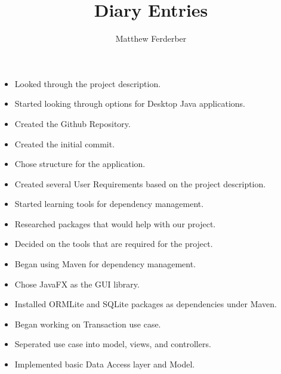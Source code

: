 \documentclass{article}
\title{Diary Entries}
\author{Matthew Ferderber}
\begin{document}
	\maketitle
	
  \begin{itemize}
    \item Looked through the project description.
		\item Started looking through options for Desktop Java applications.
  \end{itemize}
  
	
  \begin{itemize}
    \item Created the Github Repository.
    \item Created the initial commit.
    \item Chose structure for the application.
  \end{itemize}
  
  \begin{itemize}
    \item Created several User Requirements based on the project description.
    \item Started learning tools for dependency management.
    \item Researched packages that would help with our project.
  \end{itemize}

  \begin{itemize}
    \item Decided on the tools that are required for the project.
    \item Began using Maven for dependency management.
    \item Chose JavaFX as the GUI library.
    \item Installed ORMLite and SQLite packages as dependencies under Maven.
  \end{itemize}

  \begin{itemize}
    \item Began working on Transaction use case.
    \item Seperated use case into model, views, and controllers.
    \item Implemented basic Data Access layer and Model.
  \end{itemize}
\end{document}
